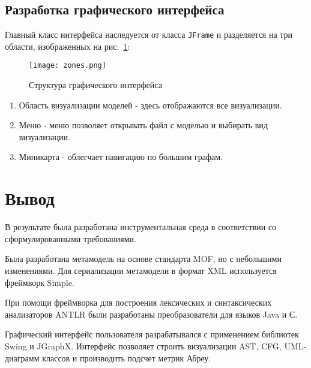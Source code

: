 \subsection{Разработка графического интерфейса}

Главный класс интерфейса наследуется от класса \texttt{JFrame} и разделяется на
три области, изображенных на рис.~\ref{fig:zones}:

\begin{figure}[htb]
    \begin{center}
        \texttt{[image: zones.png]}
    \end{center}
    \caption{Структура графического интерфейса}
    \label{fig:zones}
\end{figure}

\begin{enumerate}
    \item Область визуализации моделей - здесь отображаются все визуализации.
    \item Меню - меню позволяет открывать файл с моделью и выбирать вид
    визуализации.
    \item Миникарта - облегчает навигацию по большим графам.
\end{enumerate}

\section{Вывод}

В результате была разработана инструментальная среда в соответствии со
сформулированными требованиями.

Была разработана метамодель на основе стандарта MOF, но с небольшими изменениями.
Для сериализации метамодели в формат XML используется фреймворк Simple.

При помощи фреймворка для построения лексических и синтаксических анализаторов
ANTLR были разработаны преобразователи для языков Java и С.

Графический интерфейс пользователя разрабатывался с применением библиотек Swing
и JGraphX. Интерфейс позволяет строить визуализации AST, CFG, UML-диаграмм
классов и производить подсчет метрик Абреу.
